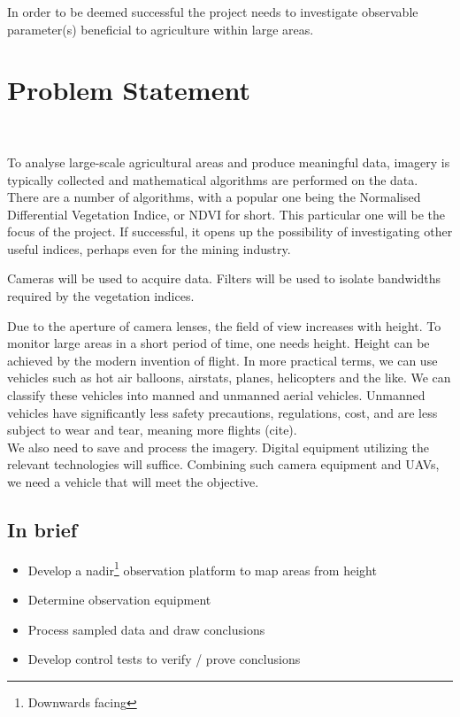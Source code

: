 \noindent
In order to be deemed successful the project needs to investigate observable parameter(s) beneficial to agriculture within large areas.

\section{Problem Statement}\

To analyse large-scale agricultural areas and produce meaningful data, imagery is typically collected and mathematical algorithms are performed on the data. There are a number of algorithms, with a popular one being the Normalised Differential Vegetation Indice, or NDVI for short. This particular one will be the focus of the project. If successful, it opens up the possibility of investigating other useful indices, perhaps even for the mining industry.

\noindent
Cameras will be used to acquire data. Filters will be used to isolate bandwidths required by the vegetation indices.

\noindent
Due to the aperture of camera lenses, the field of view increases with height. To monitor large areas in a short period of time, one needs height. Height can be achieved by the modern invention of flight. In more practical terms, we can use vehicles such as hot air balloons, airstats, planes, helicopters and the like. We can classify these vehicles into manned and unmanned aerial vehicles. Unmanned vehicles have significantly less safety precautions, regulations, cost, and are less subject to wear and tear, meaning more flights (cite).\\

\noindent
We also need to save and process the imagery. Digital equipment utilizing the relevant technologies will suffice. Combining such camera equipment and UAVs, we need a vehicle that will meet the objective.

\noindent
\subsection{In brief}
\begin{itemize}
    \item Develop a nadir\footnote{Downwards facing} observation platform to map areas from height
    \item Determine observation equipment
    \item Process sampled data and draw conclusions
    \item Develop control tests to verify / prove conclusions\\
\end{itemize}

